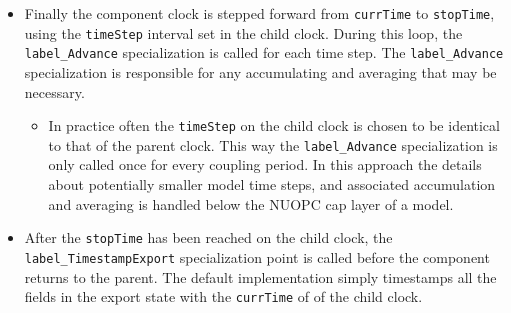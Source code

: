 \begin{itemize}
\begin{itemize}
\end{itemize}
\item Finally the component clock is stepped forward from {\tt currTime} to {\tt stopTime}, using the {\tt timeStep} interval set in the child clock. During this loop, the {\tt label\_Advance} specialization is called for each time step. The {\tt label\_Advance} specialization is responsible for any accumulating and averaging that may be necessary.
\begin{itemize}
\item In practice often the {\tt timeStep} on the child clock is chosen to be identical to that of the parent clock. This way the {\tt label\_Advance} specialization is only called once for every coupling period. In this approach the details about potentially smaller model time steps, and associated accumulation and averaging is handled below the NUOPC cap layer of a model.
\end{itemize}
\item After the {\tt stopTime} has been reached on the child clock, the {\tt label\_TimestampExport} specialization point is called before the component returns to the parent. The default implementation simply timestamps all the fields in the export state with the {\tt currTime} of of the child clock.
\end{itemize}


